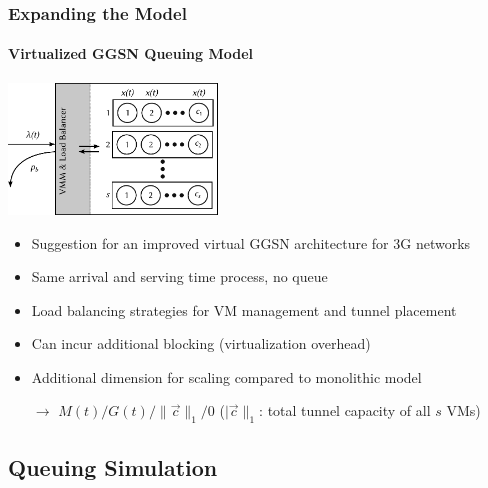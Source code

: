 \documentclass{beamer}
\begin{document}
\begin{frame}
	\frametitle{Expanding the Model}
	\framesubtitle{Virtualized GGSN Queuing Model}
		\begin{center}
			\includegraphics[height=3.5cm]{extras/ggsn-virtualized.pdf}
		\end{center}

		\begin{itemize}
			\item Suggestion for an improved virtual GGSN architecture for 3G networks
			\item Same arrival and serving time process, no queue
			\item Load balancing strategies for VM management and tunnel placement
			\item Can incur additional blocking (virtualization overhead)
			\item Additional dimension for scaling compared to monolithic model
			\item[$\rightarrow$] $M(t)/G(t)/\|\overrightarrow{c}\|_1/0$ ($|\overrightarrow{c}\|_1$: total tunnel capacity of all $s$ VMs) %
		\end{itemize}
\end{frame}


\subsection{Queuing Simulation}
\end{document}
